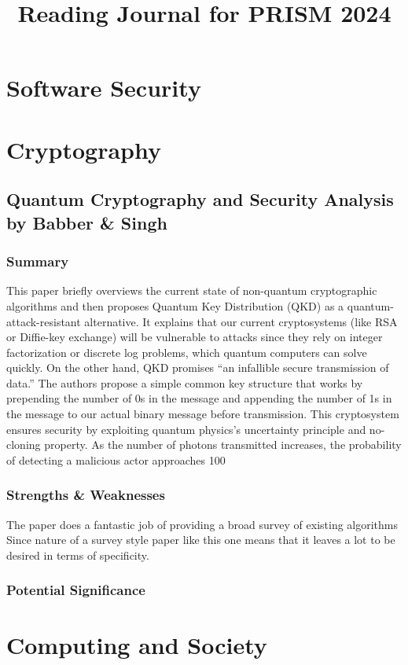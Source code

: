 \documentclass{article}
\begin{document}

\title{Reading Journal for PRISM 2024}
\author{}
\date{}
\maketitle

\section{Software Security}

\section{Cryptography}
\subsection*{Quantum Cryptography and Security Analysis by Babber \& Singh}

\subsubsection*{Summary}
This paper briefly overviews the current state of non-quantum cryptographic algorithms and then proposes Quantum Key Distribution (QKD) as a quantum-attack-resistant alternative. It explains that our current cryptosystems (like RSA or Diffie-key exchange) will be vulnerable to attacks since they rely on integer factorization or discrete log problems, which quantum computers can solve quickly. On the other hand, QKD promises “an infallible secure transmission of data.” The authors propose a simple common key structure that works by prepending the number of 0s in the message and appending the number of 1s in the message to our actual binary message before transmission. This cryptosystem ensures security by exploiting quantum physics’s uncertainty principle and no-cloning property. As the number of photons transmitted increases, the probability of detecting a malicious actor approaches 100%

\subsubsection*{Strengths \& Weaknesses}
The paper does a fantastic job of providing a broad survey of existing algorithms 
Since nature of a survey style paper like this one means that it leaves a lot to be desired in terms of specificity. 

\subsubsection*{Potential Significance}

\section{Computing and Society}

\end{document}
